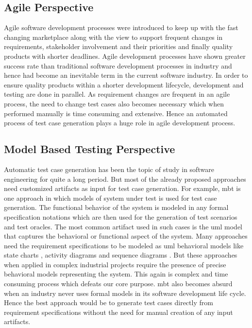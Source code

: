 \subsection{Agile Perspective}
Agile software development processes \cite{ambler2009agile} were introduced to keep up with the fast changing marketplace along with the view to support frequent changes in requirements, stakeholder involvement and their priorities and finally quality products with shorter deadlines. Agile development processes have shown greater success rate than traditional software development processes in industry and hence had become an inevitable term in the current software industry. In order to ensure quality products within a shorter development lifecycle, development and testing are done in parallel. As requirement changes are frequent in an agile process, the need to change test cases also becomes necessary which when performed manually is time consuming and extensive. Hence an automated process of test case generation plays a huge role in agile development process.
\subsection{Model Based Testing Perspective}
Automatic test case generation has been the topic of study in software engineering for quite a long period. But most of the already proposed approaches need customized artifacts as input for test case generation. For example, \gls{mbt} is one approach in which models of system under test is used for test case generation.  The functional behavior of the system is modeled in any formal specification notations \cite{carvalho2013test} which are then used for the generation of test scenarios and test oracles. The most common artifact used in such cases is the \gls{uml} model that captures the behavioral or functional aspect of the system. Many approaches need the requirement specifications to be modeled as \gls{uml} behavioral models like state charts \cite{ryser1999scenario}, activity diagrams \cite{linzhang2004generating} and sequence diagrams \cite{nebut2006automatic}.  But these approaches when applied in complex industrial projects require the presence of precise behavioral models representing the system. This again is complex and time consuming process which defeats our core purpose. \gls{mbt} also becomes absurd when an industry never uses formal models in its software development life cycle.  Hence the best approach would be to generate test cases directly from requirement specifications without the need for manual creation of any input artifacts.
